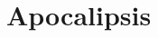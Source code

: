 \chapter{Apocalipsis}
\begin{multicols}{2}
  \raggedcolumns
  \parskip=0pt \relax
  
\end{multicols}
\newpage





















